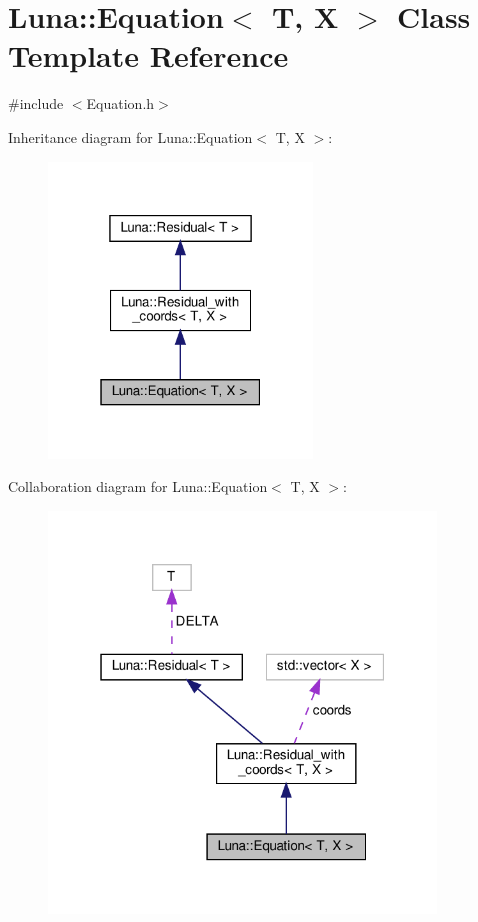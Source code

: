 \hypertarget{classLuna_1_1Equation}{}\section{Luna\+:\+:Equation$<$ T, X $>$ Class Template Reference}
\label{classLuna_1_1Equation}


{\ttfamily \#include $<$Equation.\+h$>$}



Inheritance diagram for Luna\+:\+:Equation$<$ T, X $>$\+:\nopagebreak
\begin{figure}[H]
\begin{center}
\leavevmode
\includegraphics[width=199pt]{classLuna_1_1Equation__inherit__graph}
\end{center}
\end{figure}


Collaboration diagram for Luna\+:\+:Equation$<$ T, X $>$\+:\nopagebreak
\begin{figure}[H]
\begin{center}
\leavevmode
\includegraphics[width=292pt]{classLuna_1_1Equation__coll__graph}
\end{center}
\end{figure}
